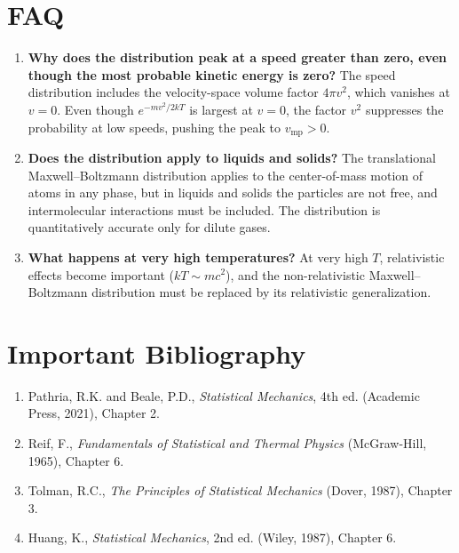 \section*{FAQ}

\begin{enumerate}
\item \textbf{Why does the distribution peak at a speed greater than zero, even though the most probable kinetic energy is zero?}
The speed distribution includes the velocity-space volume factor $4\pi v^{2}$, which vanishes at $v = 0$. Even though $e^{-mv^{2}/2kT}$ is largest at $v = 0$, the factor $v^{2}$ suppresses the probability at low speeds, pushing the peak to $v_{\text{mp}} > 0$.

\item \textbf{Does the distribution apply to liquids and solids?}
The translational Maxwell--Boltzmann distribution applies to the center-of-mass motion of atoms in any phase, but in liquids and solids the particles are not free, and intermolecular interactions must be included. The distribution is quantitatively accurate only for dilute gases.

\item \textbf{What happens at very high temperatures?}
At very high $T$, relativistic effects become important ($kT \sim mc^{2}$), and the non-relativistic Maxwell--Boltzmann distribution must be replaced by its relativistic generalization.
\end{enumerate}
\section*{Important Bibliography}

\begin{enumerate}
\item Pathria, R.K. and Beale, P.D., \textit{Statistical Mechanics}, 4th ed. (Academic Press, 2021), Chapter 2.
\item Reif, F., \textit{Fundamentals of Statistical and Thermal Physics} (McGraw-Hill, 1965), Chapter 6.
\item Tolman, R.C., \textit{The Principles of Statistical Mechanics} (Dover, 1987), Chapter 3.
\item Huang, K., \textit{Statistical Mechanics}, 2nd ed. (Wiley, 1987), Chapter 6.
\end{enumerate}

